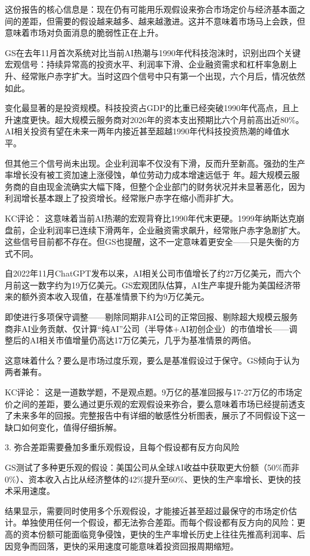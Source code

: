 \documentclass[11pt]{ctexart}
\begin{document}
这份报告的核心信息是：现在仍有可能用乐观假设来弥合市场定价与经济基本面之间的差距，但需要的假设越来越多、越来越激进。这并不意味着市场马上会跌，但意味着市场对负面消息的脆弱性正在上升。

GS在去年11月首次系统对比当前AI热潮与1990年代科技泡沫时，识别出四个关键宏观信号：持续异常高的投资水平、利润率下滑、企业融资需求和杠杆率急剧上升、经常账户赤字扩大。当时这四个信号中只有第一个出现，六个月后，情况依然如此。

变化最显著的是投资规模。科技投资占GDP的比重已经突破1990年代高点，且上升速度更快。超大规模云服务商对2026年的资本支出预期比六个月前高出近80\%。AI相关投资有望在未来一两年内接近甚至超越1990年代科技投资热潮的峰值水平。

但其他三个信号尚未出现。企业利润率不仅没有下滑，反而升至新高。强劲的生产率增长没有被工资加速上涨侵蚀，单位劳动力成本增速远低于 年。超大规模云服务商的自由现金流确实大幅下降，但整个企业部门的财务状况并未显著恶化，因为利润增长基本跟上了投资增长。经常账户赤字在缩小而非扩大。

KC评论： 这意味着当前AI热潮的宏观背脊比1990年代末更硬。1999年纳斯达克崩盘前，企业利润率已连续下滑两年，企业融资需求飙升，经常账户赤字急剧扩大。这些信号目前都不存在。但GS也提醒，这不一定意味着更安全——只是失衡的方式不同。

自2022年11月ChatGPT发布以来，AI相关公司市值增长了约27万亿美元，而六个月前这一数字约为19万亿美元。GS宏观团队估算，AI生产率提升能为美国经济带来的额外资本收入现值，在基准情景下约为9万亿美元。

即使进行多项保守调整——剔除同期非AI公司的正常回报、剔除超大规模云服务商非AI业务贡献、仅计算“纯AI”公司（半导体+AI初创企业）的市值增长——调整后的AI相关市值增量仍高达17万亿美元，几乎为基准情景的两倍。

这意味着什么？要么是市场过度乐观，要么是基准假设过于保守。GS倾向于认为两者兼有。

KC评论： 这是一道数学题，不是观点题。9万亿的基准回报与17-27万亿的市场定价之间的差距，要么通过更乐观的宏观假设来弥合，要么意味着市场已经提前透支了未来多年的回报。完整报告中有详细的敏感性分析图表，展示了不同假设下这一缺口如何变化，值得仔细拆解。

3. 弥合差距需要叠加多重乐观假设，且每个假设都有反方向风险

GS测试了多种更乐观的假设：美国公司从全球AI收益中获取更大份额（50\%而非0\%）、资本收入占比从经济整体的42\%提升至60\%、更快的生产率增长、更快的技术采用速度。

结果显示，需要同时使用多个乐观假设，才能接近甚至超过最保守的市场定价估计。单独使用任何一个假设，都无法弥合差距。而每个假设都有反方向的风险：更高的资本份额可能面临竞争侵蚀，更快的生产率增长历史上往往先推高利润率、后因竞争而回落，更快的采用速度可能意味着投资回报周期缩短。
\end{document}
